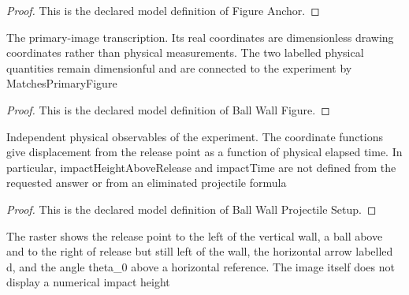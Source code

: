 \begin{proof}
  This is the declared model definition of Figure Anchor.
\end{proof}
\begin{definition}
  \label{def:physics:phyx-mini-0740:phyxminiproblems-problemphyxmini0740-ballwallfigure}
  The primary-image transcription. Its real coordinates are dimensionless drawing coordinates rather than physical measurements. The two labelled physical quantities remain dimensionful and are connected to the experiment by MatchesPrimaryFigure
\end{definition}
\begin{proof}
  This is the declared model definition of Ball Wall Figure.
\end{proof}
\begin{definition}
  \label{def:physics:phyx-mini-0740:phyxminiproblems-problemphyxmini0740-ballwallprojectilesetup}
  Independent physical observables of the experiment. The coordinate functions give displacement from the release point as a function of physical elapsed time. In particular, impactHeightAboveRelease and impactTime are not defined from the requested answer or from an eliminated projectile formula
\end{definition}
\begin{proof}
  This is the declared model definition of Ball Wall Projectile Setup.
\end{proof}
\begin{definition}
  \label{def:physics:phyx-mini-0740:phyxminiproblems-problemphyxmini0740-matchesprimaryfigure}
  The raster shows the release point to the left of the vertical wall, a ball above and to the right of release but still left of the wall, the horizontal arrow labelled d, and the angle theta\_0 above a horizontal reference. The image itself does not display a numerical impact height
\end{definition}
